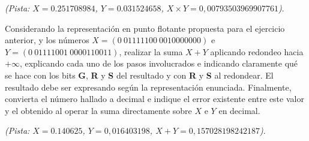 \documentclass[12pt,a4paper]{article}
\begin{document}
\textit{(Pista: $X=0.251708984$, $Y= 0.031524658$, $X \times Y = 0,00793503969907761$)}.

 Considerando la representación en punto flotante propuesta para el ejercicio anterior, y los números $X = (0 \ 01111100 \ 0010000000)$ e $Y = (0 \ 01111001 \ 0000110011)$, realizar la suma $X + Y$ aplicando redondeo hacia $+\infty$, explicando cada uno de los pasos involucrados e indicando claramente qué se hace con los bits \textbf{G}, \textbf{R} y \textbf{S} del resultado y con \textbf{R} y \textbf{S} al redondear. El resultado debe ser expresando según la representación enunciada. Finalmente, convierta el número hallado a decimal e indique el error existente entre este valor y el obtenido al operar la suma directamente sobre $X$ e $Y$ en decimal. 

\textit{(Pista: $X=0.140625$, $Y=0,016403198$, $X+Y = 0,157028198242187$)}.

\newpage
\end{document}
